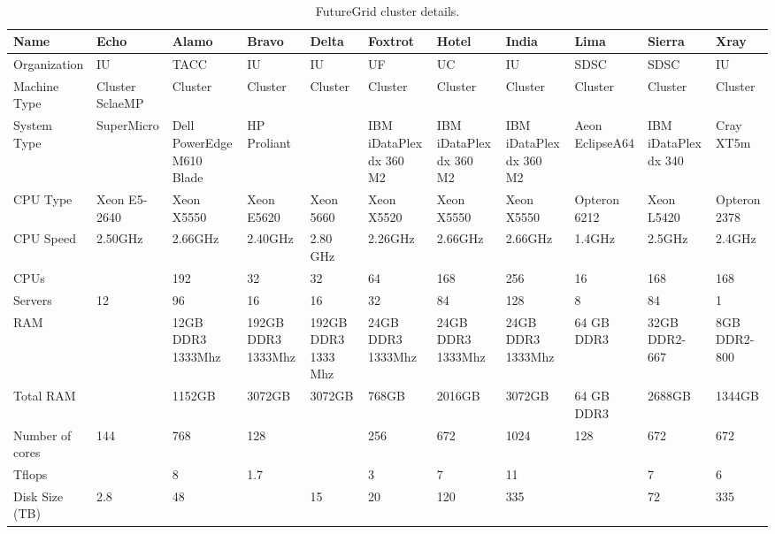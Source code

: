 \begin{sidewaystable}

\caption{FutureGrid cluster details.}\label{F:cluster-details}
~\\
\begin{footnotesize}
\begin{tabular}{|p{2cm}||p{1.5cm}p{1.5cm}p{1.5cm}p{1.5cm}p{1.5cm}p{1.5cm}p{1.5cm}p{1.5cm}p{1.5cm}p{1cm}|}
\hline
 \bf Name                                & \bf Echo & \bf Alamo & \bf
 Bravo & \bf Delta & \bf Foxtrot & \bf Hotel & \bf India & \bf Lima & \bf Sierra & \bf Xray \\
\hline
\hline
 Organization                        & IU & TACC & IU & IU & UF & UC &
 IU & SDSC & SDSC & IU \\
\hline
 Machine Type                        & Cluster SclaeMP & Cluster &
 Cluster & Cluster & Cluster & Cluster & Cluster & Cluster & Cluster & Cluster \\
\hline
 System Type                         &SuperMicro& Dell PowerEdge M610
 Blade & HP Proliant && IBM iDataPlex dx 360 M2 & IBM iDataPlex dx 360
 M2 & IBM iDataPlex dx 360 M2 & Aeon EclipseA64 & IBM iDataPlex dx 340 & Cray XT5m \\
\hline
 CPU Type                            & Xeon E5-2640 &  Xeon X5550 &
 Xeon E5620 &  Xeon 5660 &  Xeon X5520 &  Xeon X5550 &  Xeon X5550 & Opteron 6212&
 Xeon L5420 & Opteron 2378 \\
\hline
 CPU Speed                           &2.50GHz& 2.66GHz & 2.40GHz &
 2.80 GHz & 2.26GHz & 2.66GHz & 2.66GHz & 1.4GHz & 2.5GHz & 2.4GHz \\
\hline
 CPUs                                &&192&32&32&64&168&256& 16 & 168&168 \\
\hline
 Servers                             &12&96&16&16&32&84&128& 8 & 84&1 \\
\hline
 RAM                                 && 12GB DDR3 1333Mhz & 192GB DDR3
 1333Mhz & 192GB DDR3 1333 Mhz & 24GB DDR3 1333Mhz & 24GB DDR3 1333Mhz
 & 24GB DDR3 1333Mhz & 64 GB DDR3 & 32GB DDR2-667 & 8GB DDR2-800 \\
\hline
 Total RAM
 & &1152GB&3072GB&3072GB&768GB&2016GB&3072GB& 64 GB DDR3& 2688GB&1344GB \\
\hline
 Number of cores                     &144&768&128&&256&672&1024& 128 &672&672 \\
\hline
 Tflops                              &&8&1.7&&3&7&11& &7&6 \\
\hline
 Disk Size (TB)                      &2.8&48&&15&20&120&335& & 72&335 \\

\end{tabular}
\end{footnotesize}
\end{sidewaystable}
